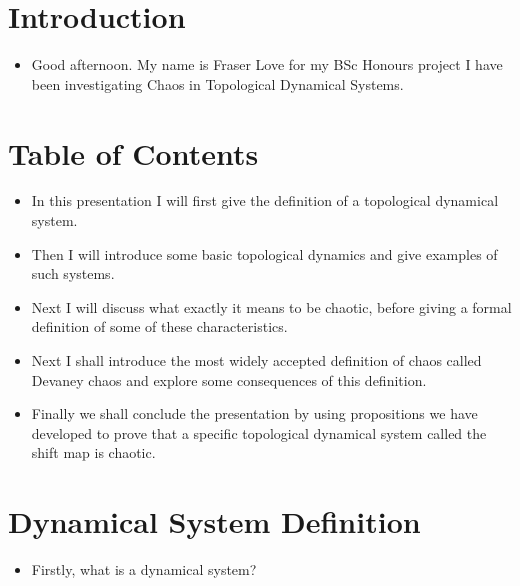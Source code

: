 \documentclass{article}
\begin{document}
    \setcounter{section}{0}
    \section{Introduction}
    \begin{itemize}
        \item Good afternoon. My name is Fraser Love for my BSc Honours project I have been investigating Chaos in Topological Dynamical Systems.
    \end{itemize}

    \section{Table of Contents}
    \begin{itemize}
        \item In this presentation I will first give the definition of a topological dynamical system.
        \item Then I will introduce some basic topological dynamics and give examples of such systems.
        \item Next I will discuss what exactly it means to be chaotic, before giving a formal definition of some of these characteristics.
        \item Next I shall introduce the most widely accepted definition of chaos called Devaney chaos and explore some consequences of this definition. \item Finally we shall conclude the presentation by using propositions we have developed to prove that a specific topological dynamical system called the shift map is chaotic.
    \end{itemize}

    \section{Dynamical System Definition}
    \begin{itemize}
        \item Firstly, what is a dynamical system?
    \end{itemize}
\end{document}
